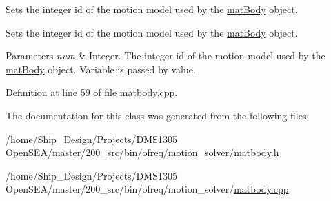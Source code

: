 Sets the integer id of the motion model used by the \hyperlink{classosea_1_1ofreq_1_1mat_body}{mat\-Body} object. 

Sets the integer id of the motion model used by the \hyperlink{classosea_1_1ofreq_1_1mat_body}{mat\-Body} object. 
\begin{DoxyParams}{Parameters}
{\em num} & Integer. The integer id of the motion model used by the \hyperlink{classosea_1_1ofreq_1_1mat_body}{mat\-Body} object. Variable is passed by value. \\
\hline
\end{DoxyParams}


Definition at line 59 of file matbody.\-cpp.



The documentation for this class was generated from the following files\-:\begin{DoxyCompactItemize}
\item 
/home/\-Ship\-\_\-\-Design/\-Projects/\-D\-M\-S1305 Open\-S\-E\-A/master/200\-\_\-src/bin/ofreq/motion\-\_\-solver/\hyperlink{matbody_8h}{matbody.\-h}\item 
/home/\-Ship\-\_\-\-Design/\-Projects/\-D\-M\-S1305 Open\-S\-E\-A/master/200\-\_\-src/bin/ofreq/motion\-\_\-solver/\hyperlink{matbody_8cpp}{matbody.\-cpp}\end{DoxyCompactItemize}
